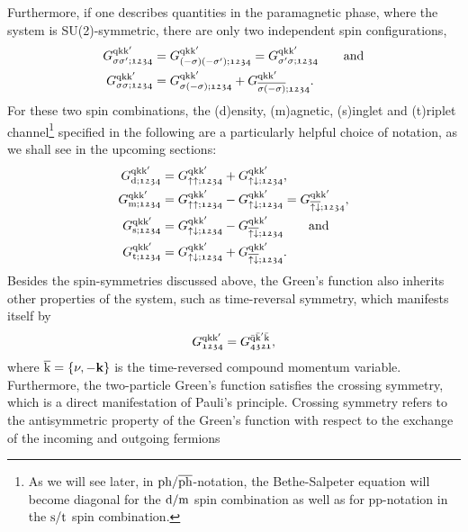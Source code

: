 \documentclass[../../main.tex]{subfiles}
\begin{document}
Furthermore, if one describes quantities in the paramagnetic phase, where the system is SU(2)-symmetric, there are only two independent spin configurations,
\begin{subequations}
\begin{align}
	G_{\sigma\sigma';\mathfrak{1234}}^{\text{q}\text{k}\text{k}'}&=G_{(-\sigma)(-\sigma');\mathfrak{1234}}^{\text{q}\text{k}\text{k}'}=G_{\sigma'\sigma;\mathfrak{1234}}^{\text{q}\text{k}\text{k}'}\qquad\text{and}\\
	G_{\sigma\sigma;\mathfrak{1234}}^{\text{q}\text{k}\text{k}'}&=G_{\sigma(-\sigma);\mathfrak{1234}}^{\text{q}\text{k}\text{k}'}+G_{\overline{\sigma(-\sigma)};\mathfrak{1234}}^{\text{q}\text{k}\text{k}'}.
\end{align}
\end{subequations}
For these two spin combinations, the (d)ensity, (m)agnetic, (s)inglet and (t)riplet channel\footnote{As we will see later, in $\text{ph}/\overline{\text{ph}}$-notation, the Bethe-Salpeter equation will become diagonal for the $\text{d}/\text{m}$ spin combination as well as for pp-notation in the $\text{s}/\text{t}$ spin combination.} specified in the following are a particularly helpful choice of notation, as we shall see in the upcoming sections: 
\begin{subequations}
\begin{align}
	G_{\text{d};\mathfrak{1234}}^{\text{q}\text{k}\text{k}'}&=G_{\uparrow\uparrow;\mathfrak{1234}}^{\text{q}\text{k}\text{k}'}+G_{\uparrow\downarrow;\mathfrak{1234}}^{\text{q}\text{k}\text{k}'},\label{eq:two_particle_green_density}\\
	G_{\text{m};\mathfrak{1234}}^{\text{q}\text{k}\text{k}'}&=G_{\uparrow\uparrow;\mathfrak{1234}}^{\text{q}\text{k}\text{k}'}-G_{\uparrow\downarrow;\mathfrak{1234}}^{\text{q}\text{k}\text{k}'}=G_{\overline{\uparrow\downarrow};\mathfrak{1234}}^{\text{q}\text{k}\text{k}'},\\
	G_{\text{s};\mathfrak{1234}}^{\text{q}\text{k}\text{k}'}&=G^{\text{q}\text{k}\text{k}'}_{\uparrow\downarrow;\mathfrak{1234}}-G^{\text{q}\text{k}\text{k}'}_{\overline{\uparrow\downarrow};\mathfrak{1234}}\qquad\text{and}\\
	G_{\text{t};\mathfrak{1234}}^{\text{q}\text{k}\text{k}'}&=G^{\text{q}\text{k}\text{k}'}_{\uparrow\downarrow;\mathfrak{1234}}+G^{\text{q}\text{k}\text{k}'}_{\overline{\uparrow\downarrow};\mathfrak{1234}}.
\label{eq:two_particle_green_magnetic}
\end{align}
\end{subequations}
Besides the spin-symmetries discussed above, the Green's function also inherits other properties of the system, such as time-reversal symmetry, which manifests itself by
\begin{align}
	G_{\mathfrak{1234}}^{\text{q}\text{k}\text{k}'}=G_{\mathfrak{4321}}^{\bar{\text{q}}\bar{\text{k}}'\bar{\text{k}}},
\end{align} 
where $\overline{\text{k}}=\{\nu,-\textbf{k}\}$ is the time-reversed compound momentum variable. Furthermore, the two-particle Green's function satisfies the crossing symmetry, which is a direct manifestation of Pauli's principle. Crossing symmetry refers to the antisymmetric property of the Green's function with respect to the exchange of the incoming and outgoing fermions
\end{document}
